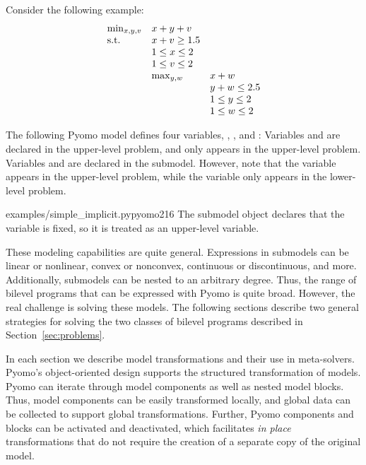 Consider the following example:
\begin{equation}
\begin{array}{lll}
\min_{x, y, v}      & x + y + v & \\
\textrm{s.t.}                 & x + v \geq 1.5 \\
                    & 1 \leq x \leq 2 &\\
                    & 1 \leq v \leq 2 & \\
                    & \max_{y,w}  & x + w\\
                    &           & y + w \leq 2.5 \\
                    &           & 1 \leq y \leq 2\\
                    &           & 1 \leq w \leq 2
\end{array}
\end{equation}

\newpage
The following Pyomo model defines four variables, , ,  and :
Variables  and  are declared in the upper-level
problem, and  only appears in the upper-level problem.
Variables  and  are declared in the submodel.
However, note that the  variable appears in the upper-level
problem, while the  variable only appears in the
lower-level problem.

 {examples/simple_implicit.py}{pyomo}{2}{16}
The submodel object declares that the  variable is fixed,
so it is treated as an upper-level variable.  
\fi

These modeling capabilities are quite general.  Expressions in
submodels can be linear or nonlinear, convex or nonconvex, continuous
or discontinuous, and more.  Additionally, submodels can be nested
to an arbitrary degree.  Thus, the range of bilevel programs that
can be expressed with Pyomo is quite broad.  However, the real
challenge is solving these models.  The following sections describe
two general strategies for solving the two classes of bilevel
programs described in Section~\ref{sec:problems}.

In each section we describe model transformations and their use in
meta-solvers.  Pyomo's object-oriented design supports the structured
transformation of models.  Pyomo can iterate through model components
as well as nested model blocks.  Thus, model components can be
easily transformed locally, and global data can be collected to
support global transformations.  Further, Pyomo components and
blocks can be activated and deactivated, which facilitates \textit{in
place} transformations that do not require the creation of a separate
copy of the original model.



